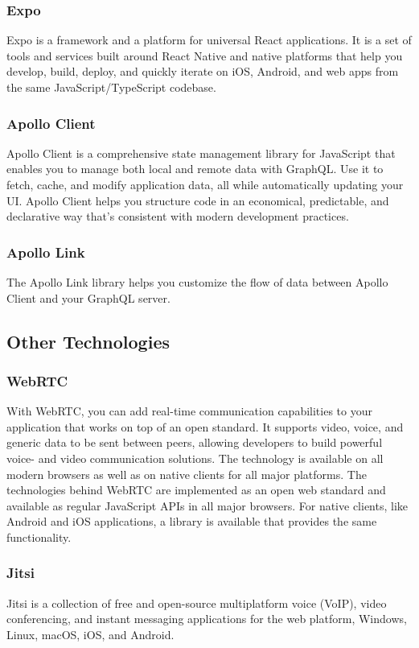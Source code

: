     \subsubsection{Expo}
    Expo is a framework and a platform for universal React applications. 
    It is a set of tools and services built around React Native and native platforms that help you develop, build, 
    deploy, and quickly iterate on iOS, Android, and web apps from the same JavaScript/TypeScript codebase.

    \subsubsection{Apollo Client}
    Apollo Client is a comprehensive state management library for JavaScript that enables you to manage both local and remote data with GraphQL.
    Use it to fetch, cache, and modify application data, all while automatically updating your UI.
    Apollo Client helps you structure code in an economical, predictable, and declarative way that's consistent with modern development practices. 

    \subsubsection{Apollo Link}
    The Apollo Link library helps you customize the flow of data between Apollo Client and your GraphQL server.

\subsection{Other Technologies}

    \subsubsection{WebRTC}
    With WebRTC, you can add real-time communication capabilities to your application that works on top of an open standard. 
    It supports video, voice, and generic data to be sent between peers, allowing developers to build powerful voice- and video communication solutions. The technology is available on all modern browsers as well as on native clients for all major platforms. The technologies behind WebRTC are implemented as an open web standard and available as regular JavaScript APIs in all major browsers. For native clients, like Android and iOS applications, a library is available that provides the same functionality.

    \subsubsection{Jitsi}
    Jitsi is a collection of free and open-source multiplatform voice (VoIP), video conferencing, and instant messaging applications for the web platform, 
    Windows, Linux, macOS, iOS, and Android.

